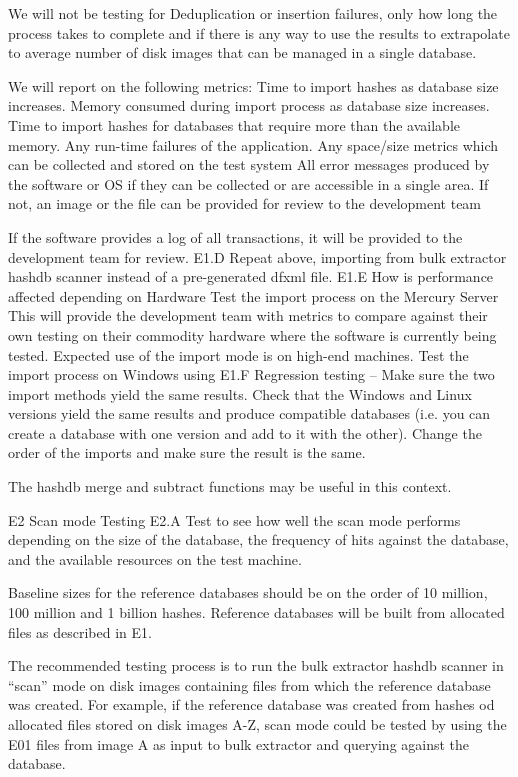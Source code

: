 \documentclass[12pt,twoside]{article}
\begin{document}
We will not be testing for Deduplication or insertion failures, only how long the process takes to complete and if there is any way to use the results to extrapolate to average number of disk images that can be managed in a single database.

We will report on the following metrics:
Time to import hashes as database size increases.
Memory consumed during import process as database size increases.
Time to import hashes for databases that require more than the available memory.
Any run-time failures of the application.
Any space/size metrics which can be collected and stored on the test system
All error messages produced by the software or OS if they can be collected or are accessible in a single area.  If not, an image or the file can be provided for review to the development team

If the software provides a log of all transactions, it will be provided to the development team for review.
E1.D
Repeat above, importing from bulk extractor hashdb scanner instead of a pre-generated dfxml file.
E1.E
How is performance affected depending on Hardware
Test the import process on the Mercury Server 
This will provide the development team with metrics to compare against their own testing on their commodity hardware where the software is currently being tested. Expected use of the import mode is on high-end machines.
Test the import process on Windows using 
E1.F
Regression testing – Make sure the two import methods yield the same results. Check that the Windows and Linux versions yield the same results and produce compatible databases (i.e. you can create a database with one version and add to it with the other). Change the order of the imports and make sure the result is the same.

The hashdb merge and subtract functions may be useful in this context.  


E2
Scan mode Testing
E2.A
Test to see how well the scan mode performs depending on the size of the database, the frequency of hits against the database, and the available resources on the test machine.

Baseline sizes for the reference databases should be on the order of 10 million, 100 million and 1 billion hashes. Reference databases will be built from allocated files as described in E1.

The recommended testing process is to run the bulk extractor hashdb scanner in “scan” mode on disk images containing files from which the reference database was created. For example, if the reference database was created from hashes od allocated files stored on disk images A-Z, scan mode could be tested by using the E01 files from image A as input to bulk extractor and querying against the database.
\end{document}
